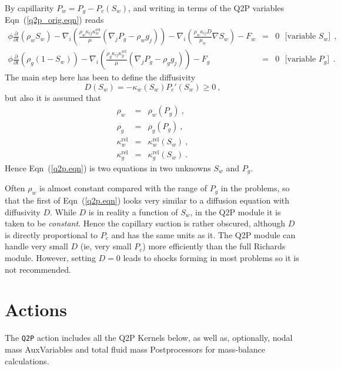 \documentclass[]{scrreprt}
\begin{document}
By capillarity $P_{w} = P_{g} - P_{c}(S_{w})$, and writing in terms of
the Q2P variables Eqn~(\ref{q2p_orig.eqn}) reads
\begin{eqnarray}
\phi \frac{\partial}{\partial t} \left( \rho_{w} S_{w} \right) - \nabla_{i}
\left( \frac{\rho_{w} \kappa_{ij}\kappa_{w}^{\mathrm{rel}}}{\mu}
(\nabla_{j}P_{g} - \rho_{w} g_{j}) \right) - \nabla_{i}\left(
\frac{\rho_{w}\kappa_{ij}D}{\mu_{w}} \nabla S_{w} \right)
- F_{w} & = & 0 \ \ \ \mbox{[variable $S_{w}$]}\ \ , \nonumber \\
\phi \frac{\partial}{\partial t} \left( \rho_{g} (1 - S_{w}) \right) - \nabla_{i}
\left( \frac{\rho_{g} \kappa_{ij}\kappa_{g}^{\mathrm{rel}}}{\mu} (\nabla_{j}P_{g} - \rho_{g} g_{j}) \right)
- F_{g} & = & 0 \ \ \ \mbox{[variable $P_{g}$]}\ \ .
\label{q2p.eqn}
\end{eqnarray}
The main step here has been to define the diffusivity
\begin{equation}
D(S_{w}) = -\kappa_{w}(S_{w})P_{c}'(S_{w}) \geq 0 \ ,
\end{equation}
but also it is assumed that
\begin{eqnarray}
\rho_{w} & = & \rho_{w}(P_{g}) \ , \nonumber \\
\rho_{g} & = & \rho_{g}(P_{g}) \ , \nonumber \\
\kappa_{w}^{\mathrm{rel}} & = & \kappa_{w}^{\mathrm{rel}}(S_{w}) \ ,
\nonumber \\
\kappa_{g}^{\mathrm{rel}} & = & \kappa_{g}^{\mathrm{rel}}(S_{w}) \ .
\end{eqnarray}
Hence Eqn~(\ref{q2p.eqn}) is two equations in two unknowns $S_{w}$ and
$P_{g}$.

Often $\rho_{w}$ is almost constant compared with the range of $P_{g}$
in the problems, so that the first of Eqn~(\ref{q2p.eqn}) looks very
similar to a diffusion equation with diffusivity $D$.  While $D$ is in
reality a function of $S_{w}$, in the Q2P module it is taken to be
{\em constant}.  Hence the capillary suction is rather obscured,
although $D$ is directly proportional to $P_{c}$ and has the same
units as it.  The Q2P module can handle very small $D$ (ie, very small
$P_{c}$) more efficiently than the full Richards module.  However,
setting $D=0$ leads to shocks forming in most problems so it is not
recommended.


\section{Actions}

The {\tt Q2P} action includes all the Q2P Kernels below, as well as,
optionally, nodal mass AuxVariables and total fluid mass
Postprocessors for mass-balance calculations.
\end{document}
